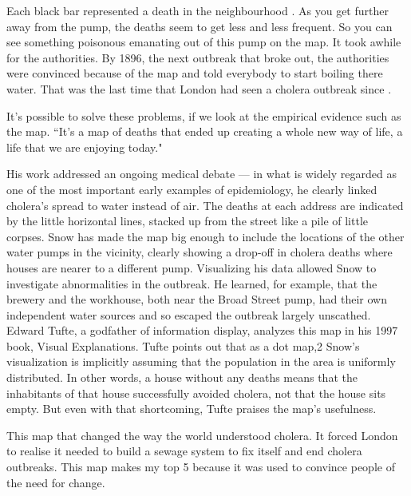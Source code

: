 \documentclass[12pt]{article}
\begin{document}
Each black bar represented a death in the neighbourhood \cite{tedtalk}. As you get further away from the pump, the deaths seem to get less and less frequent. So you can see something poisonous emanating out of this pump on the map. It took awhile for the authorities. By 1896, the next outbreak that broke out, the authorities were convinced because of the map and told everybody to start boiling there water. That was the last time that London had seen a cholera outbreak since \cite{tedtalk}. 

It's possible to solve these problems, if we look at the empirical evidence such as the map. ``It's a  map of deaths that ended up creating a whole new way of life, a life that we are enjoying today." 



His work addressed an ongoing medical debate — in what is widely regarded as one of the most important early examples of epidemiology, he clearly linked cholera’s spread to water instead of air. The deaths at each address are indicated by the little horizontal lines, stacked up from the street like a pile of little corpses. Snow has made the map big enough to include the locations of the other water pumps in the vicinity, clearly showing a drop-off in cholera deaths where houses are nearer to a different pump. Visualizing his data allowed Snow to investigate abnormalities in the outbreak. He learned, for example, that the brewery and the workhouse, both near the Broad Street pump, had their own independent water sources and so escaped the outbreak largely unscathed. Edward Tufte, a godfather of information display, analyzes this map in his 1997 book, Visual Explanations. Tufte points out that as a dot map,2 Snow’s visualization is implicitly assuming that the population in the area is uniformly distributed. In other words, a house without any deaths means that the inhabitants of that house successfully avoided cholera, not that the house sits empty. But even with that shortcoming, Tufte praises the map’s usefulness. \cite{blog}


This map that changed the way the world understood cholera. It forced London to realise it needed to build a sewage system to fix itself and end cholera outbreaks. This map makes my top 5 because it was used to convince people of the need for change.
\end{document}
